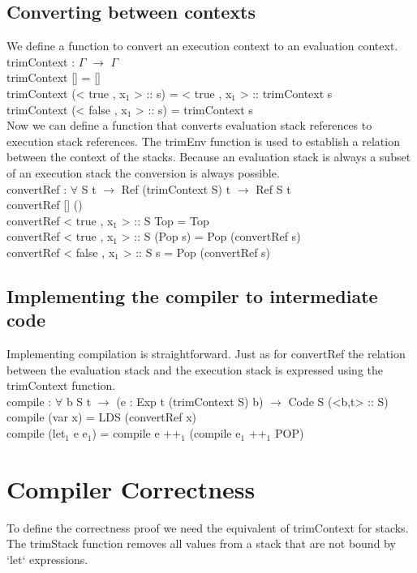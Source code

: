\documentclass[paper=a4, fontsize=11pt]{scrartcl} %
\numberwithin{equation}{section} %
\numberwithin{figure}{section} %
\numberwithin{table}{section} %
\begin{document}
\subsection{Converting between contexts}

We define a function to convert an execution context to an evaluation context.
\ttfamily
trimContext : $\Gamma$ $\rightarrow$ $\Gamma$\\
trimContext [] = []\\
trimContext (< true , x$_1$ > :: s) = < true , x$_1$ > :: trimContext s\\
trimContext (< false , x$_1$ > :: s) = trimContext s\\

\normalfont
Now we can define a function that converts evaluation stack references to execution stack references. The trimEnv function is used to establish a relation between the context of the stacks. Because an evaluation stack is always a subset of an execution stack the conversion is always possible.\\
\ttfamily
convertRef : $\forall$ {S t} $\rightarrow$ Ref (trimContext S) t $\rightarrow$ Ref S t\\
convertRef {[]} ()\\
convertRef {< true , x$_1$ > :: S} Top = Top\\
convertRef {< true , x$_1$ > :: S} (Pop s) = Pop (convertRef s)\\
convertRef {< false , x$_1$ > :: S} s = Pop (convertRef s)\\

\normalfont

\subsection{Implementing the compiler to intermediate code}
Implementing compilation is straightforward. Just as for convertRef the relation between the evaluation stack and the execution stack is expressed using the trimContext function. 
\\
\ttfamily
compile : $\forall$ {b S t} $\rightarrow$ (e : Exp t (trimContext S) b) $\rightarrow$ Code S (<b,t> :: S)\\
compile (var x) = LDS (convertRef x)\\
compile (let$_1$ e e$_1$) = compile e ++$_1$ (compile e$_1$ ++$_1$ POP)\\
\normalfont

\section{Compiler Correctness}
To define the correctness proof we need the equivalent of trimContext for stacks. The trimStack function removes all values from a stack that are not bound by `let` expressions.\\
\ttfamily
\end{document}
